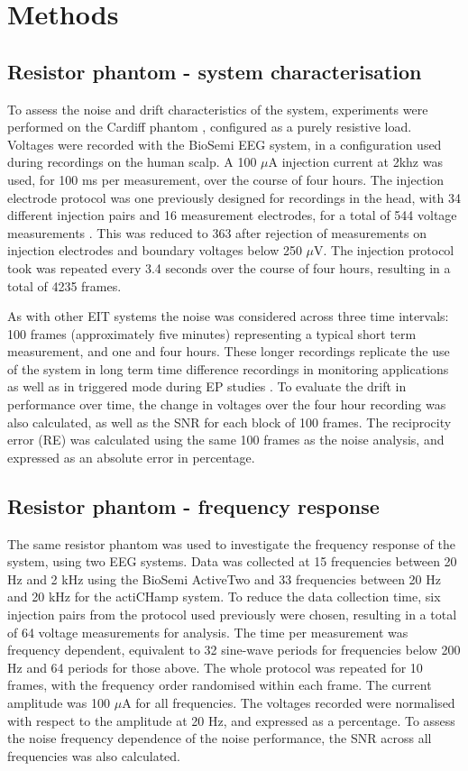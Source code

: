 \section{Methods}
\subsection{Resistor phantom - system characterisation}

To assess the noise and drift characteristics of the system, experiments were performed on the Cardiff phantom \cite{griffiths1995cole}, configured as a purely resistive load. Voltages were recorded with the BioSemi EEG system, in a configuration used during recordings on the human scalp. A 100 $\mu$A injection current at 2khz was used, for 100 ms per measurement, over the course of four hours. The injection electrode protocol was one previously designed for recordings in the head, with 34 different injection pairs and 16 measurement electrodes, for a total of 544 voltage measurements \cite{Fabrizi2009}. This was reduced to 363 after rejection of measurements on injection electrodes and boundary voltages below 250 $\mu$V. The injection protocol took was repeated every 3.4 seconds over the course of four hours, resulting in a total of 4235 frames. 

As with other EIT systems \cite{oh2007multi} the noise was considered across three time intervals: 100 frames (approximately five minutes) representing a typical short term measurement, and one and four hours. These longer recordings replicate the use of the system in long term time difference recordings in monitoring applications \cite{fu2014use} \cite{adler2012whither} as well as in triggered mode during EP studies \cite{Aristovich_2016}. To evaluate the drift in performance over time, the change in voltages over the four hour recording was also calculated, as well as the SNR for each block of 100 frames. The reciprocity error (RE) was calculated using the same 100 frames as the noise analysis, and expressed as an absolute error in percentage.

\subsection{Resistor phantom - frequency response}
\label{MethodsRPFreq}
The same resistor phantom was used to investigate the frequency response of the system, using two EEG systems. Data was collected at 15 frequencies between 20 Hz and 2 kHz using the BioSemi ActiveTwo and 33 frequencies between 20 Hz and 20 kHz for the actiCHamp system. To reduce the data collection time, six injection pairs from the protocol used previously were chosen, resulting in a total of 64 voltage measurements for analysis. The time per measurement was frequency dependent, equivalent to 32 sine-wave periods for frequencies below 200 Hz and 64 periods for those above. The whole protocol was repeated for 10 frames, with the frequency order randomised within each frame. The current amplitude was 100 $\mu$A for all frequencies. The voltages recorded were normalised with respect to the amplitude at 20 Hz, and expressed as a percentage. To assess the noise frequency dependence of the noise performance, the SNR across all frequencies was also calculated.  


